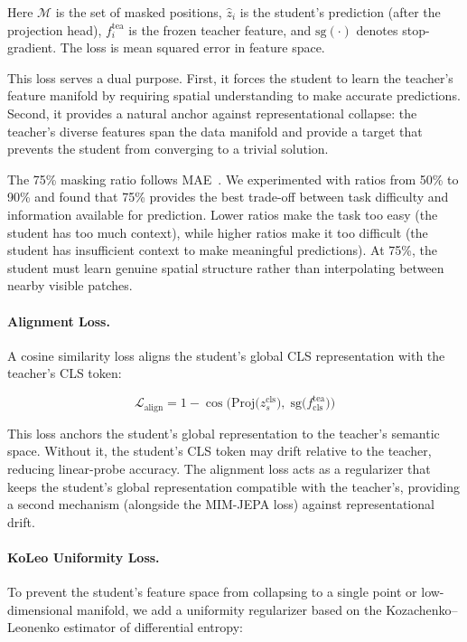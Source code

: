 \documentclass{article}
\begin{document}
Here $\mathcal{M}$ is the set of masked positions, $\hat{z}_i$ is the student's prediction (after the projection head), $f_i^{\text{tea}}$ is the frozen teacher feature, and $\text{sg}(\cdot)$ denotes stop-gradient. The loss is mean squared error in feature space.

This loss serves a dual purpose. First, it forces the student to learn the teacher's feature manifold by requiring spatial understanding to make accurate predictions. Second, it provides a natural anchor against representational collapse: the teacher's diverse features span the data manifold and provide a target that prevents the student from converging to a trivial solution.

The 75\% masking ratio follows MAE~\cite{mae}. We experimented with ratios from 50\% to 90\% and found that 75\% provides the best trade-off between task difficulty and information available for prediction. Lower ratios make the task too easy (the student has too much context), while higher ratios make it too difficult (the student has insufficient context to make meaningful predictions). At 75\%, the student must learn genuine spatial structure rather than interpolating between nearby visible patches.

\paragraph{Alignment Loss.}
A cosine similarity loss aligns the student's global CLS representation with the teacher's CLS token:

\begin{equation}
    \mathcal{L}_{\text{align}} = 1 - \cos\Big(\text{Proj}\big(z_s^{\text{cls}}\big),\; \text{sg}\big(f_{\text{cls}}^{\text{tea}}\big)\Big)
\end{equation}

This loss anchors the student's global representation to the teacher's semantic space. Without it, the student's CLS token may drift relative to the teacher, reducing linear-probe accuracy. The alignment loss acts as a regularizer that keeps the student's global representation compatible with the teacher's, providing a second mechanism (alongside the MIM-JEPA loss) against representational drift.

\paragraph{KoLeo Uniformity Loss.}
To prevent the student's feature space from collapsing to a single point or low-dimensional manifold, we add a uniformity regularizer based on the Kozachenko--Leonenko estimator of differential entropy:
\end{document}
